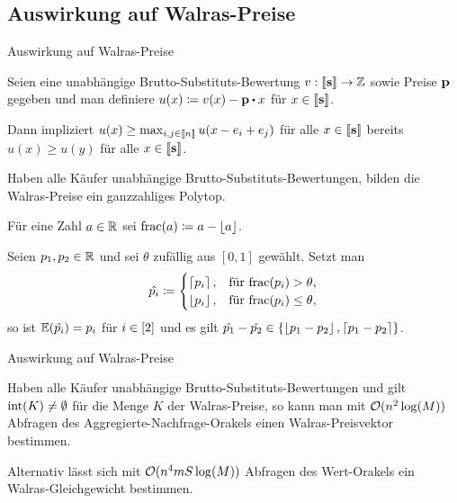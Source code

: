 \subsection{Auswirkung auf Walras-Preise}
\begin{frame}{Auswirkung auf Walras-Preise}
\pause\begin{theorem}
Seien eine unabhängige Brutto-Substituts-Bewertung $v: \left\llbracket \mathbf{s} \right\rrbracket \rightarrow \mathbb{Z}$ sowie Preise $\mathbf{p}$ gegeben und man definiere $u(x) \coloneqq v(x) - \fp \bcdot x$ für $x\in\left\llbracket \mathbf{s} \right\rrbracket$.

Dann impliziert $u(x)\geq \max_{i,j\in\left\llbracket n \right\rrbracket} u(x - e_i + e_j)$ für alle $x\in\left\llbracket \mathbf{s} \right\rrbracket$ bereits 
$u(x) \geq u(y)$ für alle $x\in\left\llbracket \mathbf{s} \right\rrbracket$.
\end{theorem}

\pause\begin{theorem}
	Haben alle Käufer unabhängige Brutto-Substituts-Bewertungen, bilden die Walras-Preise ein ganzzahliges Polytop.
\end{theorem}
\pause
Für eine Zahl $a\in\mathbb{R}$ sei $\operatorname{frac}(a) \coloneqq a - \left\lfloor a \right\rfloor$.
\begin{proposition}
	Seien $p_1,p_2\in\mathbb{R}$ und sei $\theta$ zufällig aus $[0,1]$ gewählt.
	Setzt man \[ \hat{p_i}\coloneqq \begin{cases}
		\left\lceil p_i \right\rceil, & \text{für $\operatorname{frac}(p_i) > \theta$,} \\
		\left\lfloor p_i \right\rfloor, & \text{für $\operatorname{frac}(p_i) \leq \theta$,}
	\end{cases}  \]
	so ist $\mathbb{E}(\hat{p_i}) = p_i$ für $i\in\left[ 2 \right]$ und es gilt $\hat{p_1} - \hat{p_2}\in\{ \left\lfloor p_1 - p_2 \right\rfloor, \left\lceil p_1 - p_2 \right\rceil  \}$.
\end{proposition}
\end{frame}


\begin{frame}{Auswirkung auf Walras-Preise}
\begin{theorem}
	Haben alle Käufer unabhängige Brutto-Substituts-Bewertungen und gilt $\operatorname{int}(K)\neq\emptyset$ für die Menge $K$ der Walras-Preise, so kann man mit $\mathcal{O}(n^2 \log(M))$ Abfragen des Aggregierte-Nachfrage-Orakels einen Walras-Preisvektor bestimmen.
	
	Alternativ lässt sich mit $\mathcal{O}(n^4 m S \log(M))$ Abfragen des Wert-Orakels ein Walras-Gleichgewicht bestimmen.
\end{theorem}
\end{frame}